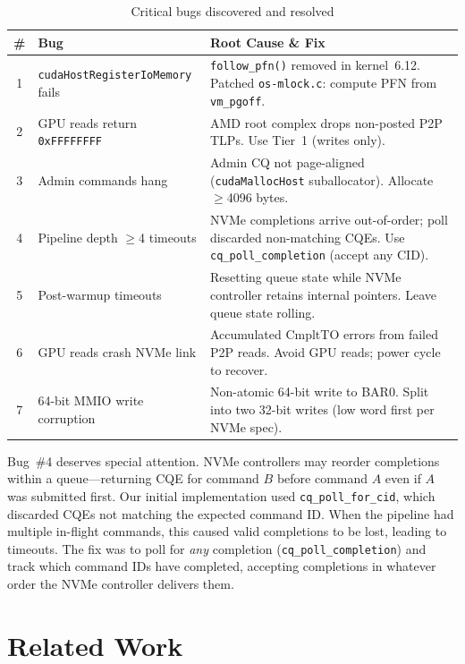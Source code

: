 \documentclass{article}
\begin{document}
\begin{table}[t]
\centering
\caption{Critical bugs discovered and resolved}
\label{tab:bugs}
\small
\begin{tabular}{clp{}}
\toprule
\textbf{\#} & \textbf{Bug} & \textbf{Root Cause \& Fix} \\
\midrule
1 & \texttt{cudaHostRegisterIoMemory} fails &
    \texttt{follow\_pfn()} removed in kernel~6.12. Patched
    \texttt{os-mlock.c}: compute PFN from \texttt{vm\_pgoff}. \\
2 & GPU reads return \texttt{0xFFFFFFFF} &
    AMD root complex drops non-posted P2P TLPs. Use Tier~1 (writes only). \\
3 & Admin commands hang &
    Admin CQ not page-aligned (\texttt{cudaMallocHost} suballocator).
    Allocate $\geq$4096 bytes. \\
4 & Pipeline depth $\geq$4 timeouts &
    NVMe completions arrive out-of-order; poll discarded non-matching CQEs.
    Use \texttt{cq\_poll\_completion} (accept any CID). \\
5 & Post-warmup timeouts &
    Resetting queue state while NVMe controller retains
    internal pointers. Leave queue state rolling. \\
6 & GPU reads crash NVMe link &
    Accumulated CmpltTO errors from failed P2P reads. Avoid GPU reads;
    power cycle to recover. \\
7 & 64-bit MMIO write corruption &
    Non-atomic 64-bit write to BAR0. Split into two 32-bit writes
    (low word first per NVMe spec). \\
\bottomrule
\end{tabular}
\end{table}

Bug~\#4 deserves special attention. NVMe controllers may reorder completions
within a queue---returning CQE for command $B$ before command $A$ even if $A$
was submitted first. Our initial implementation used
\texttt{cq\_poll\_for\_cid}, which discarded CQEs not matching the expected
command ID. When the pipeline had multiple in-flight commands, this caused
valid completions to be lost, leading to timeouts. The fix was to poll for
\emph{any} completion (\texttt{cq\_poll\_completion}) and track which command
IDs have completed, accepting completions in whatever order the NVMe
controller delivers them.

\section{Related Work}
\label{sec:related}
\end{document}
